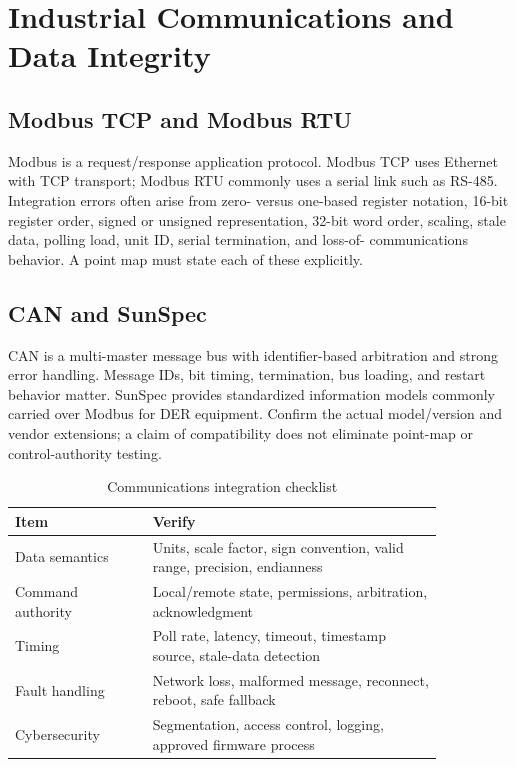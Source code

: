 \documentclass[11pt]{article}
\begin{document}
\section{Industrial Communications and Data Integrity}

\subsection{Modbus TCP and Modbus RTU}
Modbus is a request/response application protocol. Modbus TCP uses Ethernet
with TCP transport; Modbus RTU commonly uses a serial link such as RS-485.
Integration errors often arise from zero- versus one-based register notation,
16-bit register order, signed or unsigned representation, 32-bit word order,
scaling, stale data, polling load, unit ID, serial termination, and loss-of-
communications behavior. A point map must state each of these explicitly.

\subsection{CAN and SunSpec}
CAN is a multi-master message bus with identifier-based arbitration and strong
error handling. Message IDs, bit timing, termination, bus loading, and restart
behavior matter. SunSpec provides standardized information models commonly
carried over Modbus for DER equipment. Confirm the actual model/version and
vendor extensions; a claim of compatibility does not eliminate point-map or
control-authority testing.

\begin{table}[h]
\centering
\caption{Communications integration checklist}
\begin{tabular}{p{0.27\linewidth}p{0.58\linewidth}}
\toprule
Item & Verify \\
\midrule
Data semantics & Units, scale factor, sign convention, valid range, precision, endianness \\
Command authority & Local/remote state, permissions, arbitration, acknowledgment \\
Timing & Poll rate, latency, timeout, timestamp source, stale-data detection \\
Fault handling & Network loss, malformed message, reconnect, reboot, safe fallback \\
Cybersecurity & Segmentation, access control, logging, approved firmware process \\
\bottomrule
\end{tabular}
\end{table}
\end{document}
